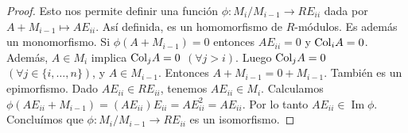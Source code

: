 \documentclass{report}
\newcommand{\Col}{\textnormal{Col}}
\DeclareMathOperator{\image}{\text{Im}}
\begin{document}
\begin{proof}
    Esto nos permite definir una función \(\phi : M_i / M_{i - 1} \rightarrow R E_{i i}\) dada por \(A + M_{i - 1} \mapsto A E_{i i}\).
    Así definida, es un homomorfismo de \(R\)-módulos.
    Es además un monomorfismo.
    Si \(\phi(A + M_{i - 1}) = 0\) entonces \(A E_{i i} = 0\) y \(\Col_i A = 0\).
    Además, \(A \in M_i\) implica \(\Col_j A = 0\) \((\forall j > i)\).
    Luego \(\Col_j A = 0\) \((\forall j \in \{i, \dots, n\})\), y \(A \in M_{i - 1}\).
    Entonces \(A + M_{i - 1} = 0 + M_{i - 1}\).
    También es un epimorfismo.
    Dado \(A E_{i i} \in R E_{i i}\), tenemos \(A E_{i i} \in M_i\).
    Calculamos \(\phi(A E_{i i} + M_{i - 1})= (A E_{i i}) E_{i i} = A E_{i i}^2 = A E_{i i}\).
    Por lo tanto \(A E_{i i} \in \image \phi\).
    Concluímos que \(\phi : M_i / M_{i - 1} \rightarrow R E_{i i}\) es un isomorfismo.
  \end{proof}
\end{document}
